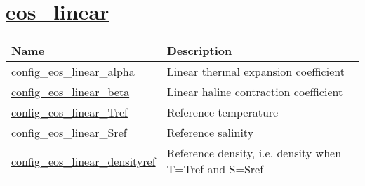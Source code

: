 \section[eos\_linear]{\hyperref[sec:nm_sec_eos_linear]{eos\_linear}}
\label{sec:nm_tab_eos_linear}

{\small
\begin{center}
\begin{longtable}{| p{2.0in} || p{4.0in} |}
	\hline
	{\bf Name} & {\bf Description} \\
	\hline
	\hline
	\hyperref[subsec:nm_sec_config_eos_linear_alpha]{config\_eos\_linear\_alpha} & Linear thermal expansion coefficient \\
	\hline
	\hyperref[subsec:nm_sec_config_eos_linear_beta]{config\_eos\_linear\_beta} & Linear haline contraction coefficient \\
	\hline
	\hyperref[subsec:nm_sec_config_eos_linear_Tref]{config\_eos\_linear\_Tref} & Reference temperature \\
	\hline
	\hyperref[subsec:nm_sec_config_eos_linear_Sref]{config\_eos\_linear\_Sref} & Reference salinity \\
	\hline
	\hyperref[subsec:nm_sec_config_eos_linear_densityref]{config\_eos\_linear\_densityref} & Reference density, i.e. density when T=Tref and S=Sref \\
	\hline
\end{longtable}
\end{center}
}
